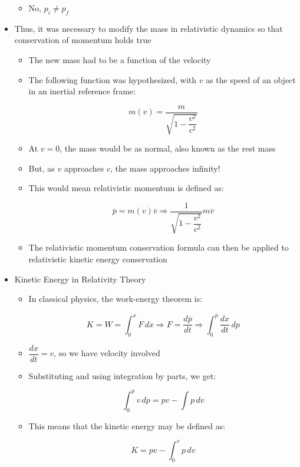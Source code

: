 \begin{itemize}
    \begin{itemize}

      \item No, $p_i \neq p_f$

    \end{itemize}

  \item Thus, it was necessary to modify the mass in relativistic dynamics so that conservation of momentum holds true

    \begin{itemize}

      \item The new mass had to be a function of the velocity

      \item The following function was hypothesized, with $v$ as the speed of an object in an inertial reference frame:

        $$\boxed{m(v)=\frac{m}{\sqrt{1-\dfrac{v^2}{c^2}}}}$$

      \item At $v=0$, the mass would be as normal, also known as the rest mass

      \item But, as $v$ approaches $c$, the mass approaches infinity!

      \item This would mean relativistic momentum is defined as:

        $$\overline{p}=m(v)\overline{v}\Rightarrow \frac{1}{\sqrt{1-\dfrac{v^2}{c^2}}}m\overline{v}$$

      \item The relativistic momentum conservation formula can then be applied to relativistic kinetic energy conservation

    \end{itemize}

  \item Kinetic Energy in Relativity Theory

    \begin{itemize}

      \item In classical physics, the work-energy theorem is:

        $$K=W=\int_0^x F\,dx\Rightarrow F=\frac{d\overline{p}}{dt}\Rightarrow \int_0^{\overline{p}} \frac{dx}{dt}\,dp$$

      \item $\dfrac{dx}{dt}=v$, so we have velocity involved

      \item Substituting and using integration by parts, we get:

        $$\int_0^p v\,dp=pv-\int p\,dv$$

      \item This means that the kinetic energy may be defined as:

        $$K=pv-\int_0^v p\,dv$$

    \end{itemize}

\end{itemize}




